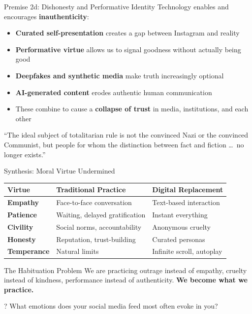 \documentclass[aspectratio=169]{beamer}
\begin{document}
\begin{frame}{Premise 2d: Dishonesty and Performative Identity}
Technology enables and encourages \textbf{inauthenticity}:

\begin{itemize}
    \item \textbf{Curated self-presentation} creates a gap between Instagram and reality
    \item \textbf{Performative virtue} allows us to signal goodness without actually being good
    \item \textbf{Deepfakes and synthetic media} make truth increasingly optional
    \item \textbf{AI-generated content} erodes authentic human communication
    \item These combine to cause a \textbf{collapse of trust} in media, institutions, and each other
\end{itemize}

\vspace{0.3cm}
\begin{quotebox}
``The ideal subject of totalitarian rule is not the convinced Nazi or the convinced Communist, but people for whom the distinction between fact and fiction \ldots\ no longer exists.''
\end{quotebox}
\end{frame}

\begin{frame}{Synthesis: Moral Virtue Undermined}
\begin{table}[h]
\centering
\small
\begin{tabular}{>{\bfseries}l l l}
\toprule
Virtue & Traditional Practice & Digital Replacement \\
\midrule
Empathy & Face-to-face conversation & Text-based interaction \\
Patience & Waiting, delayed gratification & Instant everything \\
Civility & Social norms, accountability & Anonymous cruelty \\
Honesty & Reputation, trust-building & Curated personas \\
Temperance & Natural limits & Infinite scroll, autoplay \\
\bottomrule
\end{tabular}
\end{table}

\vspace{0.3cm}
\begin{alertblock}{The Habituation Problem}
We are practicing outrage instead of empathy, cruelty instead of kindness, performance instead of authenticity. \textbf{We become what we practice.}
\end{alertblock}

\begin{alertblock}{?}
What emotions does your social media feed most often evoke in you?
\end{alertblock}
\end{frame}
\end{document}
